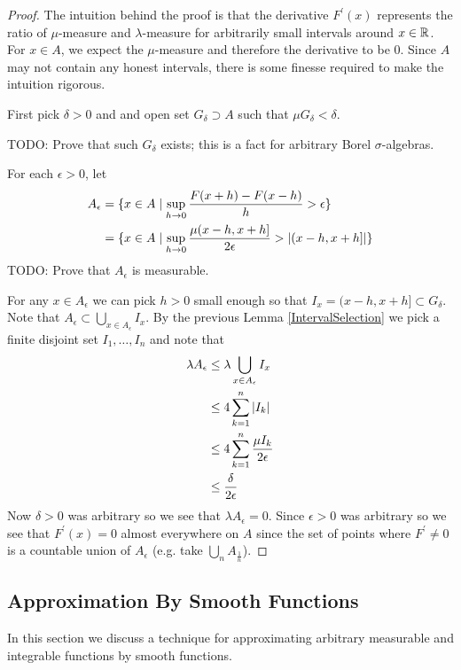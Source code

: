 \documentclass{amsart}
\theoremstyle{remark}
\theoremstyle{definition}
\begin{document}
\begin{proof}The intuition behind the proof is that the derivative
  $F^\prime(x)$ represents the ratio of $\mu$-measure and
  $\lambda$-measure for arbitrarily small intervals around $x \in
  \mathbb{R}$.  For $x \in A$, we expect the $\mu$-measure and therefore
  the derivative to be $0$.  Since $A$ may not contain any honest
  intervals, there is some finesse required to make the intuition rigorous.

First pick $\delta > 0$ and and open set $G_\delta \supset A$ such that $\mu
G_\delta < \delta$.  

TODO: Prove that such $G_\delta$ exists; this is a fact for arbitrary
Borel $\sigma$-algebras.

For each $\epsilon > 0$, let 
\begin{align*}
A_\epsilon &= \{ x \in A \mid \sup_{h \to 0} \frac{F(x + h) - F(x -
  h)}{h} > \epsilon \} \\
&= \{ x \in A \mid \sup_{h \to 0} \frac{\mu (x - h, x+h]}{2 \epsilon} > \left \vert (x-h,x+h] \right \vert \} 
\end{align*}
TODO: Prove that $A_\epsilon$ is measurable.

For any $x \in A_\epsilon$ we can pick $h > 0$ small enough so that
$I_x = (x - h, x+h] \subset G_\delta$.  Note that $A_\epsilon \subset
\bigcup_{x \in A_\epsilon} I_x$.  By the previous Lemma
\ref{IntervalSelection} we pick a finite disjoint set $I_1, \dots,
I_n$ and note that
\begin{align*}
\lambda A_\epsilon &\leq \lambda 
\bigcup_{x \in A_\epsilon} I_x \\
&\leq 4 \sum_{k=1}^n \left \vert I_k \right \vert \\
&\leq 4 \sum_{k=1}^n \frac{\mu I_k}{2 \epsilon} \\
& \leq \frac{\delta}{2\epsilon}
\end{align*}
Now $\delta > 0$ was arbitrary so we see that $\lambda A_\epsilon =
0$.  Since $\epsilon > 0$ was arbitrary so we see that $F^\prime(x) = 0$
almost everywhere on $A$ since the set of points where $F^\prime \neq
0$ is a countable union of $A_\epsilon$ (e.g. take $\bigcup_n A_{\frac{1}{n}}$).
\end{proof}

\subsection{Approximation By Smooth Functions}
In this section we discuss a technique for approximating arbitrary
measurable and integrable functions by smooth functions.  
\end{document}
